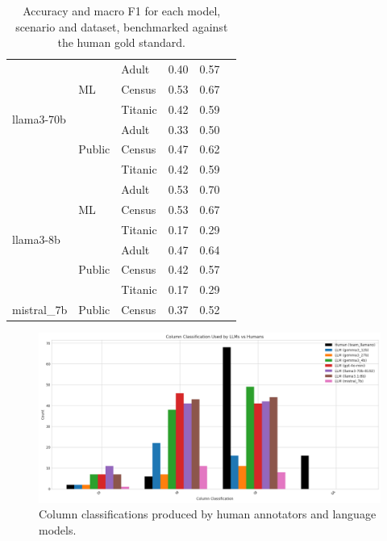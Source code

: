 \documentclass{article}
\begin{document}
\begin{table}[h]
\begin{tabular}{lllccl}
\midrule
\multirow{6}{*}{llama3-70b} & \multirow{3}{*}{ML} & Adult & 0.40 & 0.57 \\
                            &                     & Census & 0.53 & 0.67 \\
                            &                     & Titanic & 0.42 & 0.59 \\
                            & \multirow{3}{*}{Public} & Adult & 0.33 & 0.50 \\
                            &                          & Census & 0.47 & 0.62 \\
                            &                          & Titanic & 0.42 & 0.59 \\
\midrule
\multirow{6}{*}{llama3-8b} & \multirow{3}{*}{ML} & Adult & 0.53 & 0.70 \\
                           &                     & Census & 0.53 & 0.67 \\
                           &                     & Titanic & 0.17 & 0.29 \\
                           & \multirow{3}{*}{Public} & Adult & 0.47 & 0.64 \\
                           &                          & Census & 0.42 & 0.57 \\
                           &                          & Titanic & 0.17 & 0.29 \\
\midrule
mistral\_7b & Public & Census & 0.37 & 0.52 \\
\bottomrule
\end{tabular}
\caption{Accuracy and macro F1 for each model, scenario and dataset, benchmarked against the human gold standard.}
\label{tab:llm_eval_grouped}
\end{table}
\newpage

\begin{figure}[!htbp]
    \centering
    \includegraphics[width=\linewidth]{images/plot_eval2.png}
    \caption{Column classifications produced by human annotators and language models.}
    \label{fig:col}
\end{figure}
\end{document}
